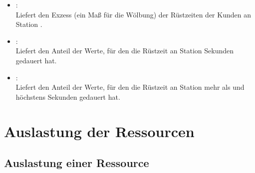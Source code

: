 \begin{itemize}
\item
{}:\\
Liefert den Exzess (ein Maß für die Wölbung) der Rüstzeiten der Kunden an Station .

\item
{}:\\
Liefert den Anteil der Werte, für den die Rüstzeit an Station   Sekunden gedauert hat.

\item
{}:\\
Liefert den Anteil der Werte, für den die Rüstzeit an Station  mehr als  und höchstens  Sekunden gedauert hat.

\end{itemize}



\section{Auslastung der Ressourcen}



\subsection{Auslastung einer Ressource}


